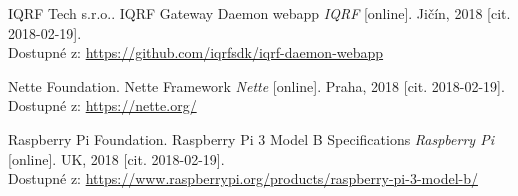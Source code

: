 \documentclass[12pt,a4paper]{article}
\begin{document}
\begin{thebibliography}{99}
IQRF Tech s.r.o.. IQRF Gateway Daemon webapp \emph{IQRF} [online]. Jičín, 2018 [cit. 2018-02-19]. \\ Dostupné z: \url{https://github.com/iqrfsdk/iqrf-daemon-webapp}

Nette Foundation. Nette Framework \emph{Nette} [online]. Praha, 2018 [cit. 2018-02-19]. \\ Dostupné z: \url{https://nette.org/}

Raspberry Pi Foundation. Raspberry Pi 3 Model B Specifications \emph{Raspberry Pi} [online]. UK, 2018 [cit. 2018-02-19]. \\ Dostupné z: \url{https://www.raspberrypi.org/products/raspberry-pi-3-model-b/}

\end{thebibliography}

\newpage

\listoffigures


\listoftables

\end{document}
